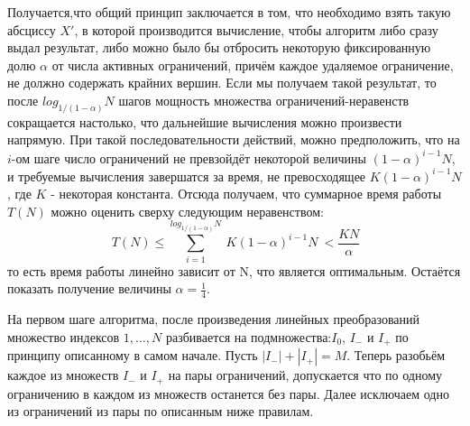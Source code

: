\documentclass[12pt,a4paper]{article}
\begin{document}


\newpage
Получается,что общий принцип заключается в том, что необходимо взять такую абсциссу  $X'$, в которой производится вычисление, чтобы алгоритм либо сразу выдал результат, либо можно было бы отбросить некоторую фиксированную долю $\alpha$ от числа активных ограничений, причём каждое удаляемое ограничение, не должно содержать крайних вершин.  Если мы получаем такой результат, то после $log_{1/(1-\alpha)}N$ шагов мощность множества ограничений-неравенств сокращается настолько, что дальнейшие вычисления можно произвести напрямую. При такой последовательности действий, можно предположить, что на $i$-ом шаге число ограничений не превзойдёт некоторой величины $(1-\alpha)^{i-1}N$, и требуемые вычисления завершатся за время, не превосходящее $K(1-\alpha)^{i-1}N$, где $K$ - некоторая константа. Отсюда получаем, что суммарное время работы $T(N)$ можно оценить сверху следующим неравенством:
\[
\ T(N)\leqslant
\sum_{i=1}^{log_{1/(1-\alpha)}N}
\ K(1-\alpha)^{i-1}N
\ < \frac{KN}{\alpha}
\]
то есть время работы линейно зависит от N, что является оптимальным. Остаётся показать получение величины $\alpha = \frac{1}{4}$.\par
На первом шаге алгоритма, после произведения линейных преобразований множество индексов $1,\dots,N$ разбивается на подмножества:$I_{0}$, $I_{-}$ и $I_{+}$ по принципу описанному в самом начале. Пусть $|I_{-}|+|I_{+}|=M$. Теперь разобьём каждое из множеств  $I_{-}$ и $I_{+}$ на пары ограничений, допускается что по одному ограничению в каждом из множеств останется без пары. Далее исключаем одно из ограничений из пары по описанным ниже правилам. \par
\end{document}
